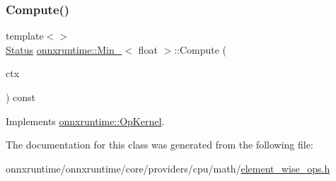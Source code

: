 \subsubsection{\texorpdfstring{Compute()}{Compute()}\hspace{0.1cm}{\footnotesize\ttfamily [2/2]}}
{\footnotesize\ttfamily template$<$$>$ \\
\mbox{\hyperlink{classonnxruntime_1_1common_1_1Status}{Status}} \mbox{\hyperlink{classonnxruntime_1_1Min__6}{onnxruntime\+::\+Min\+\_}}$<$ float $>$\+::Compute (\begin{DoxyParamCaption}\item[{\mbox{\hyperlink{classonnxruntime_1_1OpKernelContext}{Op\+Kernel\+Context}} $\ast$}]{ctx }\end{DoxyParamCaption}) const\hspace{0.3cm}{\ttfamily [virtual]}}



Implements \mbox{\hyperlink{classonnxruntime_1_1OpKernel_a9eca8656a78b1b3ab9d3351a12798650}{onnxruntime\+::\+Op\+Kernel}}.



The documentation for this class was generated from the following file\+:\begin{DoxyCompactItemize}
\item 
onnxruntime/onnxruntime/core/providers/cpu/math/\mbox{\hyperlink{element__wise__ops_8h}{element\+\_\+wise\+\_\+ops.\+h}}\end{DoxyCompactItemize}
